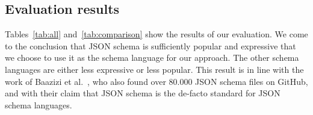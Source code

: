 \subsection{Evaluation results}\label{subsec:evaluation-results}

Tables~\ref{tab:all} and~\ref{tab:comparison} show the results of our evaluation.
We come to the conclusion that JSON schema is sufficiently popular and expressive that we choose to use it as the schema language for our approach.
The other schema languages are either less expressive or less popular.
This result is in line with the work of Baazizi et al.~\cite{baazizi2021empirical}, who also found over 80.000 JSON schema files on GitHub,
and with their claim that JSON schema is the de-facto standard for JSON schema languages.


%
%
